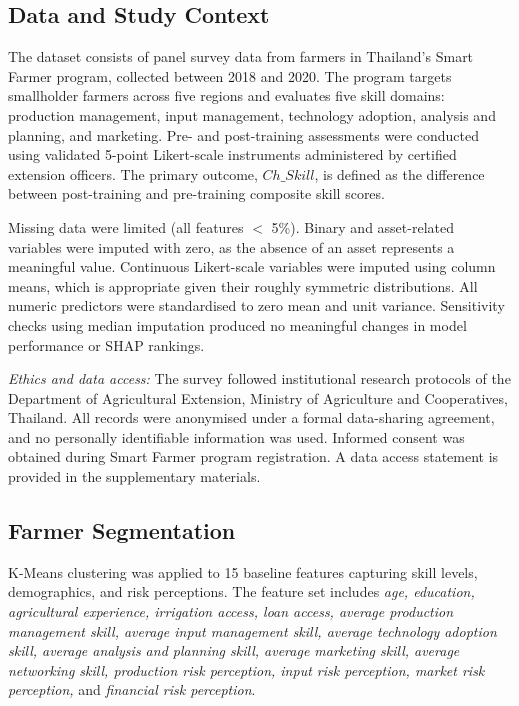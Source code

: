 \documentclass[3p,twocolumn,authoryear]{elsarticle}
\begin{document}
\subsection{Data and Study Context}

The dataset consists of panel survey data from farmers in Thailand's Smart
Farmer program, collected between 2018 and 2020. The program targets
smallholder farmers across five regions and evaluates five skill domains:
production management, input management, technology adoption, analysis and
planning, and marketing. Pre- and post-training assessments were conducted
using validated 5-point Likert-scale instruments administered by certified
extension officers. The primary outcome, $Ch\_Skill$, is defined as the
difference between post-training and pre-training composite skill scores.

Missing data were limited (all features $<$ 5\%). Binary and asset-related
variables were imputed with zero, as the absence of an asset represents a
meaningful value. Continuous Likert-scale variables were imputed using column
means, which is appropriate given their roughly symmetric distributions. All
numeric predictors were standardised to zero mean and unit variance.
Sensitivity checks using median imputation produced no meaningful changes in
model performance or SHAP rankings.

\textit{Ethics and data access:}
The survey followed institutional research protocols of the Department of
Agricultural Extension, Ministry of Agriculture and Cooperatives, Thailand.
All records were anonymised under a formal data-sharing agreement, and no
personally identifiable information was used. Informed consent was obtained
during Smart Farmer program registration. A data access statement is provided
in the supplementary materials.

\subsection{Farmer Segmentation}

K-Means clustering \citep{macqueen1967} was applied to 15 baseline features
capturing skill levels, demographics, and risk perceptions. The feature set
includes \textit{age, education, agricultural experience, irrigation access,
loan access, average production management skill, average input management
skill, average technology adoption skill, average analysis and planning skill,
average marketing skill, average networking skill, production risk perception,
input risk perception, market risk perception,} and \textit{financial risk
perception}.
\end{document}

